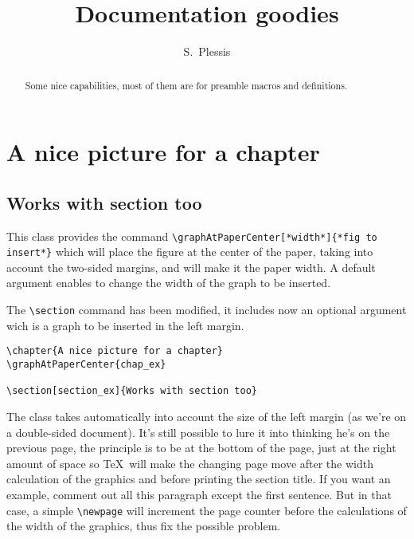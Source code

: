 \documentclass{documentation}
\makeatletter
\def\maketitle{%
\begin{titlepage}
\centering
{\Huge\@title}\vskip0.5ex
{\Large\@author}\vskip0.5ex
{version~\theversion}\vskip1ex
\texttt{[image: title\_graph]}
\end{titlepage}
}
\makeatother
\begin{document}
\title{Documentation goodies}
\author{S.~Plessis}
\maketitle

\tableofcontents

\begin{abstract}
Some nice capabilities, most of them are for
preamble macros and definitions.
\end{abstract}

\chapter{A nice picture for a chapter}

\section[section_ex]{Works with section too}

This class provides the command \verb!\graphAtPaperCenter[*width*]{*fig to insert*}! which
will place the figure at the center of the paper, taking into
account the two-sided margins, and will make it the paper width. A default
argument enables to change the width of the graph to be inserted.

The \verb!\section! command has been modified, it includes now an optional
argument wich is a graph to be inserted in the left margin.

\begin{verbatim}
\chapter{A nice picture for a chapter}
\graphAtPaperCenter{chap_ex}

\section[section_ex]{Works with section too}
\end{verbatim}

The class takes automatically into account the size
of the left margin (as we're on a double-sided document). It's still
possible to lure it into thinking he's on the previous page, the
principle is to be at the bottom of the page, just at the right
amount of space so \TeX\ will make the changing page move after
the width calculation of the graphics and before printing
the section title. If you want an example, comment out all this
paragraph except the first sentence.
But in that case, a simple \verb!\newpage! will increment the page
counter before the calculations of the width of the graphics,
thus fix the possible problem.
\end{document}
